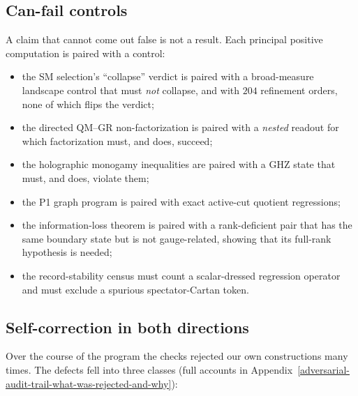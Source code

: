 \documentclass[11pt]{article}
\theoremstyle{definition}
\providecommand{\tightlist}{\setlength{\itemsep}{0pt}\setlength{\parskip}{0pt}}
\begin{document}
\subsection{Can-fail controls}\label{can-fail-controls}

A claim that cannot come out false is not a result. Each principal positive computation is paired with a control:

\begin{itemize}\tightlist
\item the SM selection's ``collapse'' verdict is paired with a broad-measure landscape control that must \emph{not}
  collapse, and with \(204\) refinement orders, none of which flips the verdict;
\item the directed QM--GR non-factorization is paired with a \emph{nested} readout for which factorization must, and
  does, succeed;
\item the holographic monogamy inequalities are paired with a GHZ state that must, and does, violate them;
\item the P1 graph program is paired with exact active-cut quotient regressions;
\item the information-loss theorem is paired with a rank-deficient pair that has the same boundary state but is not
  gauge-related, showing that its full-rank hypothesis is needed;
\item the record-stability census must count a scalar-dressed regression operator and must exclude a spurious
  spectator-Cartan token.
\end{itemize}

\subsection{Self-correction in both directions}\label{adversarial-self-correction-in-both-directions}

Over the course of the program the checks rejected our own constructions many times. The defects fell into three
classes (full accounts in Appendix~\ref{adversarial-audit-trail-what-was-rejected-and-why}):
\end{document}

